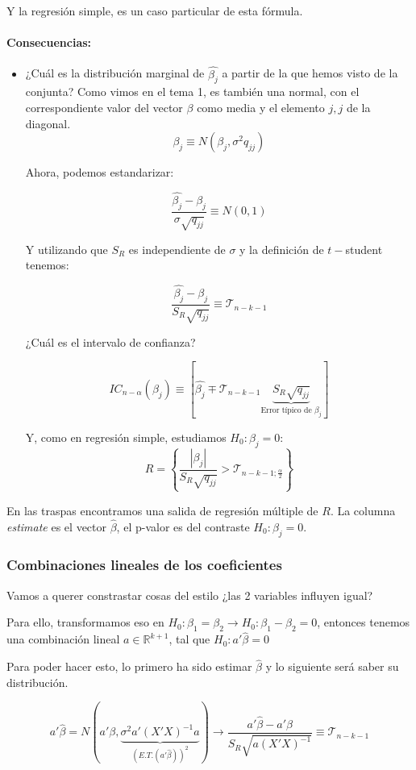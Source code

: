 Y la regresión simple, es un caso particular de esta fórmula.

\paragraph{Consecuencias:}

\begin{itemize}
	\item ¿Cuál es la distribución marginal de $\hat{β_j}$ a partir de la que hemos visto de la conjunta? Como vimos en el tema 1, es también una normal, con el correspondiente valor del vector $β$ como media y el elemento $j,j$ de la diagonal.
	\[ β_j \equiv N\left(β_j, σ^2q_{jj}\right)\]

	Ahora, podemos estandarizar:

	\[
	\frac{\hat{β_j}-β_j}{σ\sqrt{q_{jj}}} \equiv N(0,1)
	\]

	Y utilizando que $S_R$ es independiente de $σ$ y la definición de $t-$student tenemos:

	\[
	\frac{\hat{β_j}-β_j}{S_R\sqrt{q_{jj}}} \equiv \mathcal{T}_{n-k-1}
	\]

	¿Cuál es el intervalo de confianza?

	\[
		IC_{n-α}(β_j) \equiv \left[\hat{β_j}\mp \mathcal{T}_{n-k-1}\underbrace{S_R\sqrt{q_{jj}}}_{\text{Error típico de }β_j} \right]
	\]

	Y, como en regresión simple, estudiamos $H_0 : β_j = 0$:
	\[
		R = \left\{ \frac{|β_j|}{S_R\sqrt{q_{jj}}} > \mathcal{T}_{n-k-1;\frac{α}{2}} \right\}
	\]
\end{itemize}

En las traspas encontramos una salida de regresión múltiple de $R$. La columna \textit{estimate} es el vector $\hat{β}$, el p-valor es del contraste $H_0 : β_j = 0$.


\subsubsection{Combinaciones lineales de los coeficientes} Vamos a querer constrastar cosas del estilo ¿las 2 variables influyen igual?

Para ello, transformamos eso en $H_0: β_1 = β_2 \to H_0 : β_1 - β_2 = 0$, entonces tenemos una combinación lineal $a∈ℝ^{k+1}$, tal que $H_0:a'\hat{β} = 0$

Para poder hacer esto, lo primero ha sido estimar $\hat{β}$ y lo siguiente será saber su distribución.

\[a'\hat{β} = N\left(a'β,\underbrace{σ^2a'(X'X)^{-1}a}_{\left(E.T.(a'\hat{β})\right)^2}\right) \to \frac{a'\hat{β} - a'β}{S_R\sqrt{a(X'X)^{-1}}} \equiv \mathcal{T}_{n-k-1}\]

